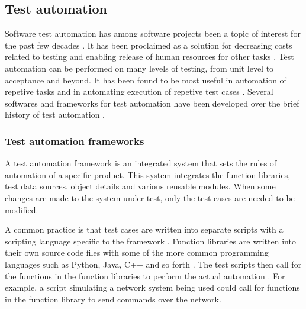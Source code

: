\documentclass[english,12pt,a4paper,pdftex,elec,utf8]{aaltothesis}
\begin{document}
\subsection{Test automation}
Software test automation has among software projects been a topic of interest for the past few decades \cite{testautomationconf2013}. It has been proclaimed as a solution for decreasing costs related to testing and enabling release of human resources for other tasks \cite{workshopontestautomation, kasurinentesting}. Test automation can be performed on many levels of testing, from unit level to acceptance and beyond. It has been found to be most useful in automation of repetive tasks and in automating execution of repetive test cases \cite{kasurinentesting}. Several softwares and frameworks for test automation have been developed over the brief history of test automation \cite{testautomationconf2013, kasurinentesting}. \par 
\subsubsection{Test automation frameworks}
A test automation framework is an integrated system that sets the rules of automation of a specific product. This system integrates the function libraries, test data sources, object details and various reusable modules. When some changes are made to the system under test, only the test cases are needed to be modified. \cite{exploringuseofta} \par
A common practice is that test cases are written into separate scripts with a scripting language specific to the framework \cite{robotmain, exploringuseofta}. Function libraries are written into their own source code files with some of the more common programming languages such as Python, Java, C++ and so forth \cite{robotmain, modelbasedtesting}.
The test scripts then call for the functions in the function libraries to perform the actual automation \cite{modelbasedtesting}. For example, a script simulating a network system being used could call for functions in the function library to send commands over the network.\par 
\end{document}
